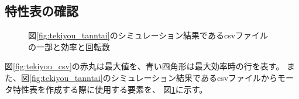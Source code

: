 \subsection{特性表の確認}
\begin{figure}[t]
	\centering
	\caption{図\ref{fig:tekiyou_tanntai}のシミュレーション結果であるcsvファイルの一部と効率と回転数}
	\label{fig:tekiyou_csv_wakariyasui}
\end{figure}
図\ref{fig:tekiyou_csv}の赤丸は最大値を、青い四角形は最大効率時の行を表す。
また、図\ref{fig:tekiyou_tanntai}のシミュレーション結果であるcsvファイルからモータ特性表を作成する際に使用する要素を、
図\ref{fig:tekiyou_csv_wakariyasui}に示す。

